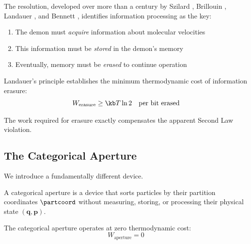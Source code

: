 The resolution, developed over more than a century by Szilard \cite{szilard1929}, Brillouin \cite{brillouin1951}, Landauer \cite{landauer1961}, and Bennett \cite{bennett1982,bennett2003}, identifies information processing as the key:
\begin{enumerate}
    \item The demon must \textit{acquire} information about molecular velocities
    \item This information must be \textit{stored} in the demon's memory
    \item Eventually, memory must be \textit{erased} to continue operation
\end{enumerate}

Landauer's principle establishes the minimum thermodynamic cost of information erasure:
\begin{equation}
W_{\text{erasure}} \geq \kb T \ln 2 \quad \text{per bit erased}
\label{eq:landauer_principle}
\end{equation}

The work required for erasure exactly compensates the apparent Second Law violation.

\subsection{The Categorical Aperture}

We introduce a fundamentally different device.

\begin{definition}
A categorical aperture is a device that sorts particles by their partition coordinates $\partcoord$ without measuring, storing, or processing their physical state $(\mathbf{q}, \mathbf{p})$.
\end{definition}

\begin{theorem}
\label{thm:aperture}
The categorical aperture operates at zero thermodynamic cost:
\begin{equation}
W_{\text{aperture}} = 0
\end{equation}
\end{theorem}

